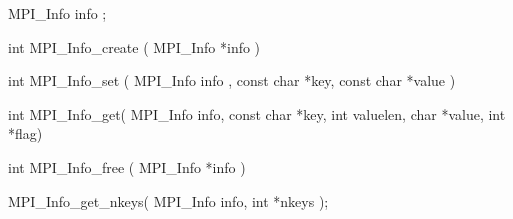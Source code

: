MPI_Info info ;

int MPI_Info_create ( MPI_Info *info )

int MPI_Info_set ( MPI_Info info , const char *key, const char *value )

int MPI_Info_get( MPI_Info info,
    const char *key, int valuelen, char *value, int *flag)

int MPI_Info_free ( MPI_Info *info )

MPI_Info_get_nkeys( MPI_Info info, int *nkeys );
